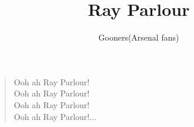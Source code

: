 \documentclass[a4paper,12pt]{article}
\title{Ray Parlour}
\author{Gooners(Arsenal fans)}
\date{}
\begin{document}
	
	\maketitle
	
	\begin{verse}
		
		Ooh ah Ray Parlour! \\
		Ooh ah Ray Parlour! \\
		Ooh ah Ray Parlour! \\
		Ooh ah Ray Parlour!$\ldots$
		
	\end{verse}
	
\end{document}
